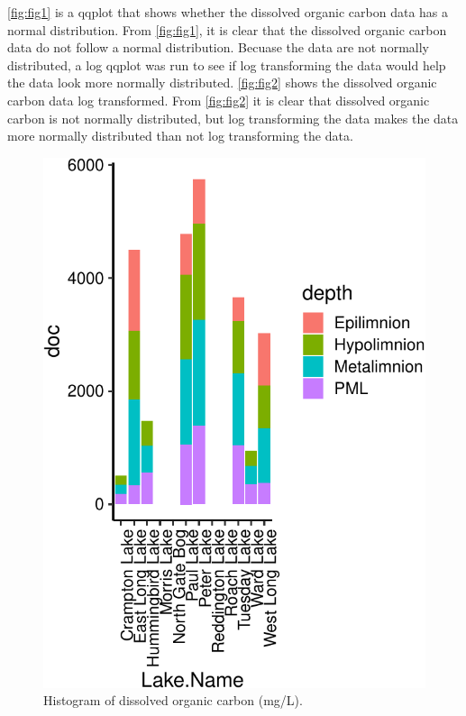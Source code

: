\documentclass[12pt,]{article}
\begin{document}
\autoref{fig:fig1} is a qqplot that shows whether the dissolved organic
carbon data has a normal distribution. From \autoref{fig:fig1}, it is
clear that the dissolved organic carbon data do not follow a normal
distribution. Becuase the data are not normally distributed, a log
qqplot was run to see if log transforming the data would help the data
look more normally distributed. \autoref{fig:fig2} shows the dissolved
organic carbon data log transformed. From \autoref{fig:fig2} it is clear
that dissolved organic carbon is not normally distributed, but log
transforming the data makes the data more normally distributed than not
log transforming the data.

\begin{figure}
\centering
\includegraphics{Watson_ENV872_Project_files/figure-latex/unnamed-chunk-7-1.pdf}
\caption{\label{fig:fig3}Histogram of dissolved organic carbon (mg/L).}
\end{figure}
\end{document}
